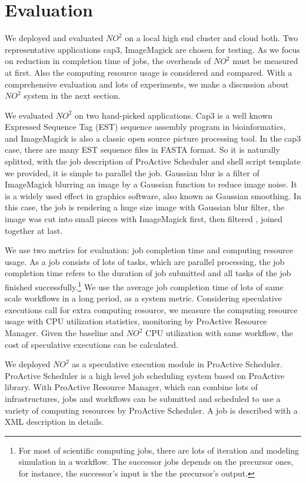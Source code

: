 \section{Evaluation}
We deployed and evaluated $NO^2$ on a local high end cluster and cloud both. Two representative applications cap3, ImageMagick are chosen for testing. As we focus on reduction in completion time of jobs, the overheads of $NO^2$ must be measured at first. Also the computing resource usage is considered and compared. With a comprehensive evaluation and lots of experiments, we make a discussion about $NO^2$ system in the next section.

We evaluated $NO^2$ on two hand-picked applications. Cap3 is a well known Expressed Sequence Tag (EST) sequence assembly program in bioinformatics, and ImageMagick is also a classic open source picture processing tool. In the cap3 case, there are many EST sequence files in FASTA format. So it is naturally splitted, with the job description of ProActive Scheduler and shell script template we provided, it is simple to parallel the job. Gaussian blur is a filter of ImageMagick blurring an image by a Gaussian function to reduce image noise. It is a widely used effect in graphics software, also known as Gaussian smoothing. In this case, the job is rendering a huge size image with Gaussian blur filter, the image was cut into small pieces with ImageMagick first, then filtered , joined together at last.

We use two metrics for evaluation: job completion time and computing resource usage. As a job consists of lots of tasks, which are parallel processing, the job completion time refers to the duration of job submitted and all tasks of the job finished successfully.\footnote{For most of scientific computing jobs, there are lots of iteration and modeling simulation in a workflow. The successor jobs depends on the precursor ones, for instance, the successor's input is the the precursor's output.} We use the average job completion time of lots of same scale workflows in a long period, as a system metric. Considering speculative executions call for extra computing resource, we measure the computing resource usage with CPU utilization statistics, monitoring by ProActive Resource Manager. Given the baseline and $NO^2$ CPU utilization with same workflow, the cost of speculative executions can be calculated.

We deployed $NO^2$ as a speculative execution module in ProActive Scheduler. ProActive Scheduler is a high level job scheduling system based on ProActive library. With ProActive Resource Manager, which can combine lots of infrastructures, jobs and workflows can be submitted and scheduled to use a variety of computing resources by ProActive Scheduler. A job is described with a XML description in details.


